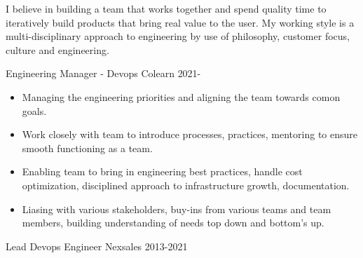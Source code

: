 \documentclass[11pt]{spidercv}
\begin{document}
    





    \begin{MainPart}

		{
			I believe in building a team that works together and spend quality time to iteratively build products that bring real value to the user. My working style is a multi-disciplinary approach to engineering by use of philosophy, customer focus, culture and engineering.

		}
		
    \Experience
        {\ColorHighlight}
		{Engineering Manager - Devops}
		{Colearn}
        {2021-\faUndo}
        {   
            \begin{itemize}
            	\item[\ding{51}] Managing the engineering priorities and aligning the team towards comon goals.\\
            	\item[\ding{51}] Work closely with team to introduce processes, practices, mentoring to ensure smooth functioning as a team. \\
 	           \item[\ding{51}] Enabling team to bring in engineering best practices, handle cost optimization, disciplined approach to infrastructure growth, documentation.
 	           \item[\ding{51}] Liasing with various stakeholders, buy-ins from various teams and team members, building understanding of needs top down and bottom's up.
            \end{itemize}        
        }
    \Experience
        {\ColorHighlight}
		{Lead Devops Engineer}
		{Nexsales}
        {2013-2021}
        {  
        	
        		
            
}
\end{MainPart}
\end{document}
